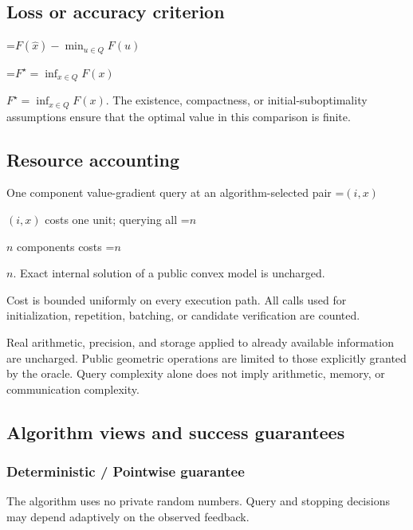 \documentclass[10pt,a4paper]{article}
\newcommand{\AtlasMath}[1]{\par\begingroup\centering\setbox0=\hbox{$\displaystyle #1$}\ifdim\wd0>1.4\linewidth\typeout{ATLAS WIDE FORMULA: \the\wd0}\fi\ifdim\wd0>\linewidth\resizebox{\linewidth}{!}{\box0}\else\box0\fi\par\endgroup}
\newcommand{\AtlasInlineMath}[1]{\begingroup\setbox0=\hbox{$#1$}\ifdim\wd0>.4\linewidth\endgroup\AtlasMath{#1}\else\endgroup$#1$\fi}
\begin{document}
\subsection{Loss or accuracy criterion}



\AtlasMath{F(\widehat{x})-\min_{u\in Q}F(u)}




\AtlasInlineMath{F^\star=\inf_{x\in Q}F(x)}. The existence, compactness, or initial-suboptimality assumptions ensure that the optimal value in this comparison is finite.



\subsection{Resource accounting}


One component value-gradient query at an algorithm-selected pair \AtlasInlineMath{(i,x)} costs one unit; querying all \AtlasInlineMath{n} components costs \AtlasInlineMath{n}. Exact internal solution of a public convex model is uncharged.



Cost is bounded uniformly on every execution path. All calls used for initialization, repetition, batching, or candidate verification are counted.



Real arithmetic, precision, and storage applied to already available information are uncharged. Public geometric operations are limited to those explicitly granted by the oracle. Query complexity alone does not imply arithmetic, memory, or communication complexity.



\subsection{Algorithm views and success guarantees}


\subsubsection{Deterministic / Pointwise guarantee}


The algorithm uses no private random numbers. Query and stopping decisions may depend adaptively on the observed feedback.
\end{document}
